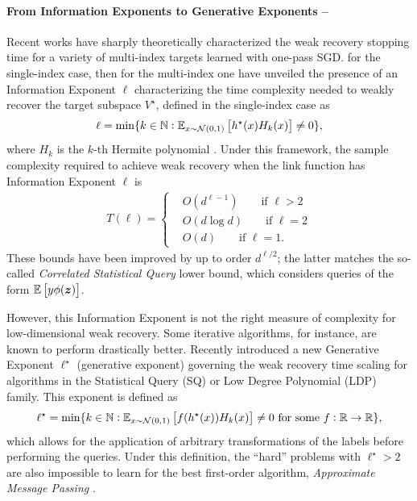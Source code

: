\paragraph{From Information Exponents to Generative Exponents --} Recent works have sharply theoretically characterized the weak recovery stopping time for a variety of multi-index targets learned with one-pass SGD. \cite{arous2021online} for the single-index case, then \cite{abbe2022merged} for the multi-index one have unveiled the presence of an Information Exponent $\ell$ characterizing the time complexity needed to weakly recover the target subspace $V^\star$, defined in the single-index case as
\begin{equation}
    \ell = \min \{ k \in \mathbb{N}  :  \mathbb{E}_{x \sim \mathcal{N}(0, 1)}\left[h^\star(x)H_k(x)\right] \neq 0 \},
\end{equation}
where $H_k$ is the $k$-th Hermite polynomial \citep{odonnell2014analysis}.
Under this framework, the sample complexity required to achieve weak recovery when the link function has Information Exponent $\ell$ is \citep{arous2021online}
\begin{align} \label{2405:eq:gba_time_scaling}
    T(\ell) = 
        \begin{cases}
        &O(d^{\ell -1} ) \qquad \text{if $\ell>2$} \\
        &O(d \log{d} ) \qquad \text{if $\ell=2$} \\
        &O(d) \qquad \text{if $\ell=1$}.
    \end{cases}
\end{align}
These bounds have been improved by \cite{damian2023smoothing} up to order $d^{\ell/2}$; the latter matches the so-called \emph{Correlated Statistical Query} lower bound, which considers queries of the form $\mathbb{E}\left[y \phi({\boldsymbol{z}})\right]$.

However, this Information Exponent is not the right measure of complexity for low-dimensional weak recovery. Some iterative algorithms, for instance, are known to perform drastically better\citep{barbier2019optimal,celentano2021high,mondelli2018fundamental,luo2019optimal,maillard2020phase,troiani2024fundamental}. Recently \cite{damian2024computational} introduced a new Generative Exponent $\ell^\star$ (generative exponent) governing the weak recovery time scaling for algorithms in the Statistical Query (SQ) or Low Degree Polynomial (LDP) family. This exponent is defined as
\begin{equation}
    \ell^\star = \min \{ k \in \mathbb{N}  :  \mathbb{E}_{x \sim \mathcal{N}(0, 1)}\left[f(h^\star(x))H_k(x)\right] \neq 0 \ \text{for some} \ f: \mathbb{R} \to \mathbb{R} \},
\end{equation}
which allows for the application of arbitrary transformations of the labels before performing the queries. Under this definition, the ``hard'' problems with $\ell^\star > 2$ are also impossible to learn for the best first-order algorithm, \emph{Approximate Message Passing} \citep{troiani2024fundamental}. 

